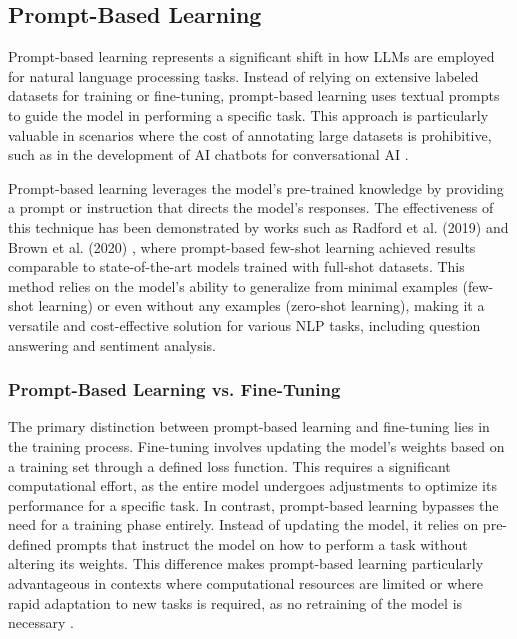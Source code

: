 
\subsection{Prompt-Based Learning}

Prompt-based learning represents a significant shift in how LLMs are employed for natural language processing tasks. Instead of relying on extensive labeled datasets for training or fine-tuning, prompt-based learning uses textual prompts to guide the model in performing a specific task. This approach is particularly valuable in scenarios where the cost of annotating large datasets is prohibitive, such as in the development of AI chatbots for conversational AI \cite{madotto2021few}.

Prompt-based learning leverages the model's pre-trained knowledge by providing a prompt or instruction that directs the model's responses. The effectiveness of this technique has been demonstrated by works such as Radford et al. (2019) \cite{radford2019language} and Brown et al. (2020) \cite{brown2020language}, where prompt-based few-shot learning achieved results comparable to state-of-the-art models trained with full-shot datasets. This method relies on the model's ability to generalize from minimal examples (few-shot learning) or even without any examples (zero-shot learning), making it a versatile and cost-effective solution for various NLP tasks, including question answering and sentiment analysis.

\subsubsection{Prompt-Based Learning vs. Fine-Tuning}

The primary distinction between prompt-based learning and fine-tuning lies in the training process. Fine-tuning involves updating the model's weights based on a training set through a defined loss function. This requires a significant computational effort, as the entire model undergoes adjustments to optimize its performance for a specific task. In contrast, prompt-based learning bypasses the need for a training phase entirely. Instead of updating the model, it relies on pre-defined prompts that instruct the model on how to perform a task without altering its weights. This difference makes prompt-based learning particularly advantageous in contexts where computational resources are limited or where rapid adaptation to new tasks is required, as no retraining of the model is necessary \cite{madotto2021few}.

